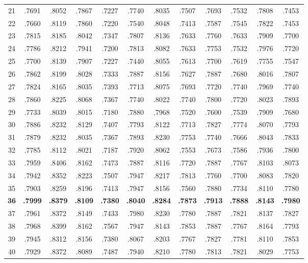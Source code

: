 \begin{table}[!htbp]
\begin{tabular}{|c*{11}{c}|}
21  & .7691 & .8052 & .7867 & .7227 & .7740 & .8035 & .7507 & .7693 & .7532 & .7808 & .7453 \\
22  & .7660 & .8119 & .7860 & .7220 & .7540 & .8048 & .7413 & .7587 & .7545 & .7822 & .7453 \\
23  & .7815 & .8185 & .8042 & .7347 & .7807 & .8136 & .7633 & .7760 & .7633 & .7909 & .7700 \\
24  & .7786 & .8212 & .7941 & .7200 & .7813 & .8082 & .7633 & .7753 & .7532 & .7976 & .7720 \\
25  & .7700 & .8139 & .7907 & .7227 & .7440 & .8055 & .7613 & .7700 & .7619 & .7755 & .7547 \\
26  & .7862 & .8199 & .8028 & .7333 & .7887 & .8156 & .7627 & .7887 & .7680 & .8016 & .7807 \\
27  & .7824 & .8165 & .8035 & .7393 & .7713 & .8075 & .7693 & .7720 & .7740 & .7969 & .7740 \\
28  & .7860 & .8225 & .8068 & .7367 & .7740 & .8022 & .7740 & .7800 & .7720 & .8023 & .7893 \\
29  & .7733 & .8039 & .8015 & .7180 & .7880 & .7968 & .7520 & .7600 & .7539 & .7909 & .7680 \\
30  & .7886 & .8232 & .8129 & .7407 & .7793 & .8122 & .7713 & .7827 & .7774 & .8070 & .7793 \\
31  & .7879 & .8232 & .8035 & .7367 & .7893 & .8230 & .7753 & .7740 & .7666 & .8043 & .7833 \\
32  & .7785 & .8112 & .8021 & .7187 & .7920 & .8062 & .7553 & .7673 & .7586 & .7936 & .7800 \\
33  & .7959 & .8406 & .8162 & .7473 & .7887 & .8116 & .7720 & .7887 & .7767 & .8103 & .8073 \\
34  & .7942 & .8352 & .8223 & .7507 & .7947 & .8217 & .7813 & .7760 & .7700 & .8083 & .7820 \\
35  & .7903 & .8259 & .8196 & .7413 & .7947 & .8156 & .7560 & .7880 & .7734 & .8110 & .7780 \\
\textbf{36} & \textbf{.7999} & \textbf{.8379} & \textbf{.8109} & \textbf{.7380} & \textbf{.8040} & \textbf{.8284} & \textbf{.7873} & \textbf{.7913} & \textbf{.7888} & \textbf{.8143} & \textbf{.7980} \\
37  & .7961 & .8372 & .8149 & .7433 & .7980 & .8230 & .7780 & .7887 & .7821 & .8137 & .7827 \\
38  & .7968 & .8399 & .8162 & .7567 & .7947 & .8143 & .7853 & .7887 & .7767 & .8164 & .7793 \\
39  & .7945 & .8312 & .8156 & .7380 & .8067 & .8203 & .7767 & .7827 & .7781 & .8110 & .7853 \\
40  & .7929 & .8372 & .8089 & .7487 & .7940 & .8210 & .7780 & .7813 & .7821 & .8029 & .7753 \\
\hline
\end{tabular}
\end{table}
